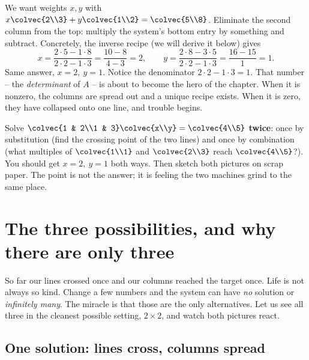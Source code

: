 \begin{example}
\label{ch06:ex-col}
We want weights $x,y$ with $x\colvec{2\\3}+y\colvec{1\\2}=\colvec{5\\8}$.
Eliminate the second column from the top: multiply the system's bottom entry
by something and subtract. Concretely, the inverse recipe (we will derive it
below) gives
\[
  x = \frac{2\cdot 5 - 1\cdot 8}{2\cdot 2 - 1\cdot 3}=\frac{10-8}{4-3}=2,
  \qquad
  y = \frac{2\cdot 8 - 3\cdot 5}{2\cdot 2 - 1\cdot 3}=\frac{16-15}{1}=1.
\]
Same answer, $x=2,\ y=1$. Notice the denominator $2\cdot2-1\cdot3=1$. That
number -- the \emph{determinant} of $A$ -- is about to become the hero of the
chapter. When it is nonzero, the columns are spread out and a unique recipe
exists. When it is zero, they have collapsed onto one line, and trouble
begins.
\end{example}

\begin{labbox}
Solve $\colvec{1 & 2\\1 & 3}\colvec{x\\y}=\colvec{4\\5}$ \textbf{twice}:
once by substitution (find the crossing point of the two lines) and once by
combination (what multiples of $\colvec{1\\1}$ and $\colvec{2\\3}$ reach
$\colvec{4\\5}$?). You should get $x=2,\ y=1$ both ways. Then sketch both
pictures on scrap paper. The point is not the answer; it is feeling the two
machines grind to the same place.
\end{labbox}

\section{The three possibilities, and why there are only three}

So far our lines crossed once and our columns reached the target once. Life
is not always so kind. Change a few numbers and the system can have
\emph{no} solution or \emph{infinitely many}. The miracle is that those are
the only alternatives. Let us see all three in the cleanest possible
setting, $2\times 2$, and watch both pictures react.

\subsection{One solution: lines cross, columns spread}

